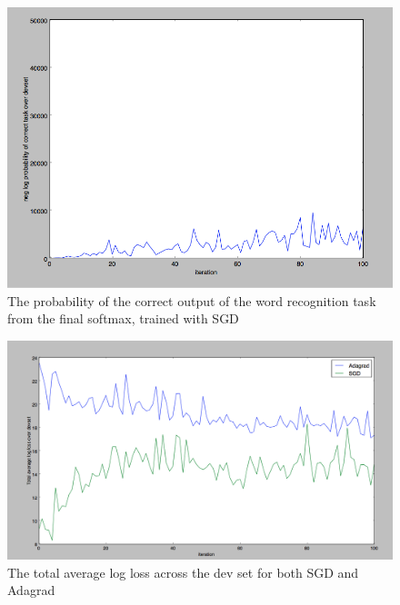 \documentclass{article}
\begin{document}
\begin{figure}[h!]
\centering
\includegraphics[scale=.2]{images/sgd_word.png}
\caption{The probability of the correct output of the word recognition task from the final softmax, trained with SGD}
\label{fig:prob_word}
\end{figure}


\begin{figure}[h!]
\centering
\includegraphics[scale=.2]{images/log_losses.png}
\caption{The total average log loss across the dev set for both SGD and Adagrad}
\label{fig:log_loss}
\end{figure}
\end{document}

